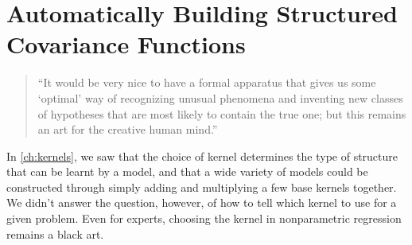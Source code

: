 
\inbpdocument


\chapter{Automatically Building Structured Covariance Functions}
\label{ch:grammar}

\begin{quotation}
``It would be very nice to have a formal apparatus that gives us some `optimal' way of recognizing unusual phenomena and inventing new classes of hypotheses that are most likely to contain the true one; but this remains an art for the creative human mind.''

\hspace*{\fill}
\end{quotation}


In \cref{ch:kernels}, we saw that the choice of kernel determines the type of structure that can be learnt by a \gp{} model, and that a wide variety of models could be constructed through simply adding and multiplying a few base kernels together.
We didn't answer the question, however, of how to tell which kernel to use for a given problem.
Even for experts, choosing the kernel in nonparametric regression remains a black art.



